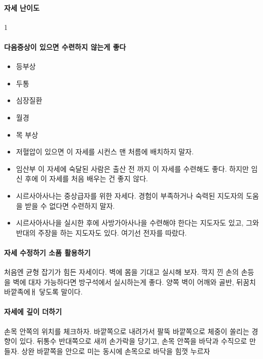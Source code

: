 \documentclass[12pt, a4paper, oneside]{book}
\begin{document}
\paragraph{자세 난이도}
1

\paragraph{다음증상이 있으면 수련하지 않는게 좋다}

			\begin{itemize}[topsep=0.0em, parsep=0.0em, itemsep=0em, leftmargin=6.0em, labelwidth=3em, labelsep=3em] 
			\item
					등부상
			\item
					두통
			\item
					심장질환
			\item
					월경
			\item
					목 부상
			\item
					저혈압이 있으면 이 자세를 시컨스 맨 처름에 배치하지 말자.
			\item
					임산부 이 자세에 숙달된 사람은 출산 전 까지 이 자세를 수련해도 좋다.
					하지만 임신 후에 이 자세를 처음 배우는 건 좋지 않다.
			\item
					시르사아사나는 중상급자를 위한 자세다.
					경험이 부족하거나 숙력된 지도자의 도움을 받을 수 없다면 수련하지 말자.
			\item
					시르사아사나을 실시한 후에 사방가아사나을 수련해야 한다는 지도자도 있고, 그와 반대의 주장을 하는 지도자도 있다.
					여기선 전자를 따랐다.
			\end{itemize}

\paragraph{자세 수정하기 소품 활용하기}

			처음엔 균형 잡기가 힘든 자세이다.
			벽에 몸을 기대고 실시해 보자.
			깍지 낀 손의 손등을 벽에 대자
			가능하다면 방구석에서 실시하는게 좋다.
			양쪽 벽이 어깨와 골반, 뒤꿈치 바깥족에ㅐ 닿도록 말이다.



\paragraph{자세에 깊이 더하기}

			손목 안쪽의 위치를  체크하자. 
			바깥쪽으로 내려가서 팔뚝 바깥쪽으로 체중이 쏠리는 경향이 있다.
			뒤통수 반대쪽으로 새끼 손가락을 당기고, 손목 안쪽을 바닥과 수직으로 만들자.
			상완 바깥쪽을 안으로 미는 동시에 손목으로 바닥을 힘껏 누르자
\end{document}
